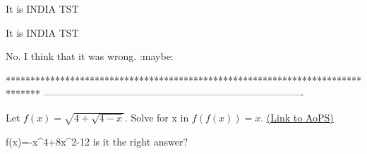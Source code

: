 \begin{solution}
	It is INDIA TST
\end{solution}



\begin{solution}
	\begin{tcolorbox}It is INDIA TST
 \end{tcolorbox}
No. I think that it was wrong.  :maybe:
\end{solution}
*******************************************************************************
-------------------------------------------------------------------------------

\begin{problem}
	Let $f(x)=\sqrt{4+\sqrt{4-x}}$. Solve for x in $f(f(x))=x$.
	\flushright \href{https://artofproblemsolving.com/community/c6h482932}{(Link to AoPS)}
\end{problem}



\begin{solution}
	f(x)=-x^4+8x^2-12    is it the right answer?
\end{solution}



